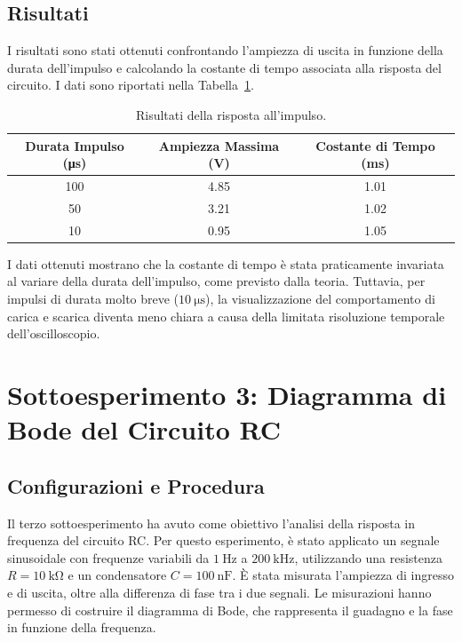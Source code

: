 \documentclass[a4paper,12pt]{article}
\begin{document}
\subsection{Risultati}
I risultati sono stati ottenuti confrontando l'ampiezza di uscita in funzione della durata dell'impulso e calcolando la costante di tempo associata alla risposta del circuito. I dati sono riportati nella Tabella~\ref{tab:rc_impulse_response}.

\begin{table}[H]
\centering
\begin{tabular}{|c|c|c|}
\hline
\textbf{Durata Impulso (\si{\micro\second})} & \textbf{Ampiezza Massima (\si{\volt})} & \textbf{Costante di Tempo (\si{\milli\second})} \\ \hline
100 & 4.85 & 1.01 \\ \hline
50 & 3.21 & 1.02 \\ \hline
10 & 0.95 & 1.05 \\ \hline
\end{tabular}
\caption{Risultati della risposta all’impulso.}
\label{tab:rc_impulse_response}
\end{table}

I dati ottenuti mostrano che la costante di tempo è stata praticamente invariata al variare della durata dell'impulso, come previsto dalla teoria. Tuttavia, per impulsi di durata molto breve (\(\SI{10}{\micro\second}\)), la visualizzazione del comportamento di carica e scarica diventa meno chiara a causa della limitata risoluzione temporale dell'oscilloscopio.


\section{Sottoesperimento 3: Diagramma di Bode del Circuito RC}
\subsection{Configurazioni e Procedura}
Il terzo sottoesperimento ha avuto come obiettivo l'analisi della risposta in frequenza del circuito RC. Per questo esperimento, è stato applicato un segnale sinusoidale con frequenze variabili da \(\SI{1}{\hertz}\) a \(\SI{200}{\kilo\hertz}\), utilizzando una resistenza \( R = \SI{10}{\kilo\ohm} \) e un condensatore \( C = \SI{100}{\nano\farad} \). È stata misurata l'ampiezza di ingresso e di uscita, oltre alla differenza di fase tra i due segnali. Le misurazioni hanno permesso di costruire il diagramma di Bode, che rappresenta il guadagno e la fase in funzione della frequenza.
\end{document}
